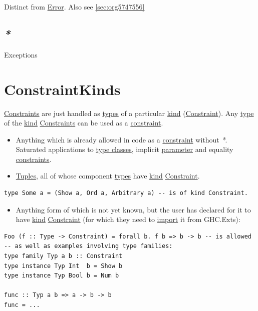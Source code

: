 \documentclass[a4paper,14pt,oneside]{book}
\begin{document}
Distinct from \hyperref[org28005ed]{Error}. Also see \ref{sec:org5747556}

\section{\emph{*}}
\label{sec:org39d0412}

\label{org91c0ee8}Exceptions

\chapter{\label{org45c52b1}ConstraintKinds}
\label{sec:orga0a2948}
\hyperref[org0febfcf]{Constraints} are just handled as \hyperref[org5a18391]{types} of a particular \hyperref[org0955619]{kind} (\hyperref[org7c03d46]{Constraint}).
Any \hyperref[org7c4e373]{type} of the \hyperref[org0955619]{kind} \hyperref[org0febfcf]{Constraints} can be used as a \hyperref[org7c03d46]{constraint}.
\begin{itemize}
\item Anything which is already allowed in code as a \hyperref[org7c03d46]{constraint} without \emph{*}. Saturated applications to \hyperref[org7a82298]{type classes}, implicit \hyperref[org4a4206a]{parameter} and equality \hyperref[org0febfcf]{constraints}.
\item \hyperref[org92ad6c3]{Tuples}, all of whose component \hyperref[org5a18391]{types} have \hyperref[org0955619]{kind} \hyperref[org7c03d46]{Constraint}.
\end{itemize}
\begin{verbatim}
type Some a = (Show a, Ord a, Arbitrary a) -- is of kind Constraint.
\end{verbatim}
\begin{itemize}
\item Anything form of which is not yet known, but the user has declared for it to have \hyperref[org0955619]{kind} \hyperref[org7c03d46]{Constraint} (for which they need to \hyperref[orgaa83127]{import} it from GHC.Exts):
\end{itemize}
\begin{verbatim}
Foo (f :: Type -> Constraint) = forall b. f b => b -> b -- is allowed
-- as well as examples involving type families:
type family Typ a b :: Constraint
type instance Typ Int  b = Show b
type instance Typ Bool b = Num b

func :: Typ a b => a -> b -> b
func = ...
\end{verbatim}
\end{document}
